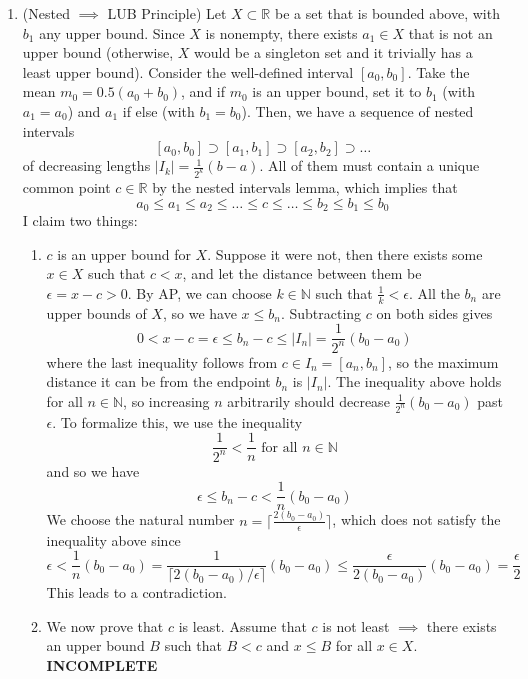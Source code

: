 \begin{solution}
\begin{enumerate}
      \item (Nested $\implies$ LUB Principle) Let $X \subset \mathbb{R}$ be a set that is bounded above, with $b_1$ any upper bound. Since $X$ is nonempty, there exists $a_1 \in X$ that is not an upper bound (otherwise, $X$ would be a singleton set and it trivially has a least upper bound). Consider the well-defined interval $[a_0, b_0]$. Take the mean $m_0 = 0.5 (a_0 + b_0)$, and if $m_0$ is an upper bound, set it to $b_1$ (with $a_1 = a_0$) and $a_1$ if else (with $b_1 = b_0$). Then, we have a sequence of nested intervals 
      \[[a_0, b_0] \supset [a_1, b_1] \supset [a_2, b_2] \supset \ldots \]
      of decreasing lengths $|I_k| = \frac{1}{2^{k}} (b - a)$. All of them must contain a unique common point $c \in \mathbb{R}$ by the nested intervals lemma, which implies that 
      \[a_0 \leq a_1 \leq a_2 \leq \ldots \leq c \leq \ldots \leq b_2 \leq b_1 \leq b_0\]
      I claim two things: 
      \begin{enumerate}
          \item $c$ is an upper bound for $X$. Suppose it were not, then there exists some $x \in X$ such that $c < x$, and let the distance between them be $\epsilon = x - c > 0$. By AP, we can choose $k \in \mathbb{N}$ such that $\frac{1}{k} < \epsilon$. All the $b_n$ are upper bounds of $X$, so we have $x \leq b_n$. Subtracting $c$ on both sides gives 
          \[0 < x - c = \epsilon \leq b_n - c \leq |I_n| = \frac{1}{2^n} (b_0 - a_0)\]
          where the last inequality follows from $c \in I_n = [a_n, b_n]$, so the maximum distance it can be from the endpoint $b_n$ is $|I_n|$. The inequality above holds for all $n \in \mathbb{N}$, so increasing $n$ arbitrarily should decrease $\frac{1}{2^n} (b_0 - a_0)$ past $\epsilon$. To formalize this, we use the inequality
          \[\frac{1}{2^n} < \frac{1}{n} \text{ for all } n \in \mathbb{N}\]
          and so we have 
          \[\epsilon \leq b_n - c < \frac{1}{n} (b_0 - a_0)\]
          We choose the natural number $n = \lceil \frac{2(b_0 - a_0)}{\epsilon} \rceil$, which does not satisfy the inequality above since 
          \[\epsilon < \frac{1}{n} (b_0 - a_0) = \frac{1}{\lceil 2(b_0 - a_0)/\epsilon \rceil} (b_0 - a_0) \leq \frac{\epsilon}{2(b_0 - a_0)} (b_0 - a_0) = \frac{\epsilon}{2}\]
          This leads to a contradiction. 
          \item We now prove that $c$ is least. Assume that $c$ is not least $\implies$ there exists an upper bound $B$ such that $B < c$ and $x \leq B$ for all $x \in X$. \textbf{INCOMPLETE}
      \end{enumerate}
    \end{enumerate}
  \end{solution}

